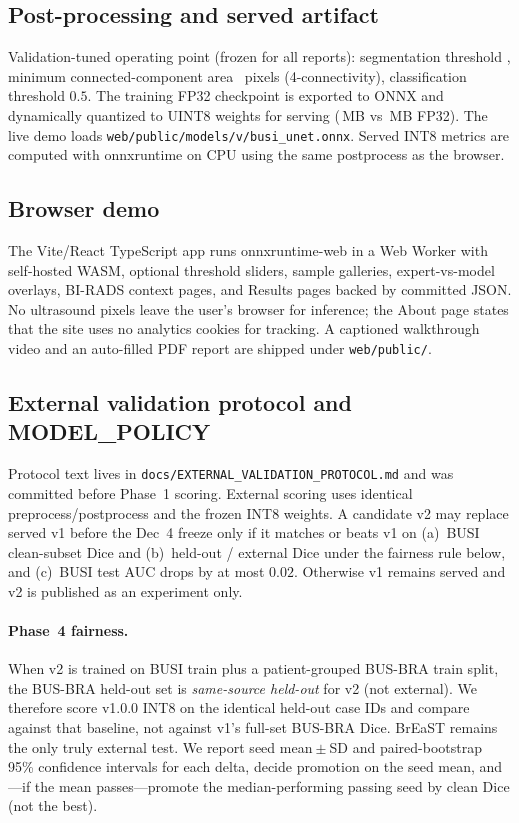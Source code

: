 \documentclass[11pt,a4paper]{article}
\begin{document}
\subsection{Post-processing and served artifact}

Validation-tuned operating point (frozen for all reports): segmentation threshold
\MetricSegThreshold, minimum connected-component area \MetricMinArea\ pixels (4-connectivity),
classification threshold $0.5$. The training FP32 checkpoint is exported to ONNX and
dynamically quantized to UINT8 weights for serving
(\MetricOnnxMb\,MB vs \MetricFpMb\,MB FP32). The live demo loads
\texttt{web/public/models/v\MetricModelVersion/busi\_unet.onnx}. Served INT8 metrics are computed
with onnxruntime on CPU using the same postprocess as the browser.

\subsection{Browser demo}

The Vite/React TypeScript app runs onnxruntime-web in a Web Worker with self-hosted WASM,
optional threshold sliders, sample galleries, expert-vs-model overlays, BI-RADS context pages,
and Results pages backed by committed JSON. No ultrasound pixels leave the user's browser for
inference; the About page states that the site uses no analytics cookies for tracking. A
captioned walkthrough video and an auto-filled PDF report are shipped under
\texttt{web/public/}.

\subsection{External validation protocol and MODEL\_POLICY}

Protocol text lives in \texttt{docs/EXTERNAL\_VALIDATION\_PROTOCOL.md} and was committed before
Phase~1 scoring. External scoring uses identical preprocess/postprocess and the frozen INT8
weights. A candidate v2 may replace served v1 before the Dec~4 freeze only if it matches or
beats v1 on (a)~BUSI clean-subset Dice and (b)~held-out / external Dice under the fairness
rule below, and (c)~BUSI test AUC drops by at most $0.02$. Otherwise v1 remains served and v2
is published as an experiment only.

\paragraph{Phase~4 fairness.}
When v2 is trained on BUSI train plus a patient-grouped BUS-BRA train split, the BUS-BRA
held-out set is \emph{same-source held-out} for v2 (not external). We therefore score
v1.0.0 INT8 on the identical held-out case IDs and compare against that baseline, not against
v1's full-set BUS-BRA Dice. BrEaST remains the only truly external test. We report seed
mean${}\pm{}$SD and paired-bootstrap 95\% confidence intervals for each delta, decide
promotion on the seed mean, and---if the mean passes---promote the median-performing
passing seed by clean Dice (not the best).
\end{document}
